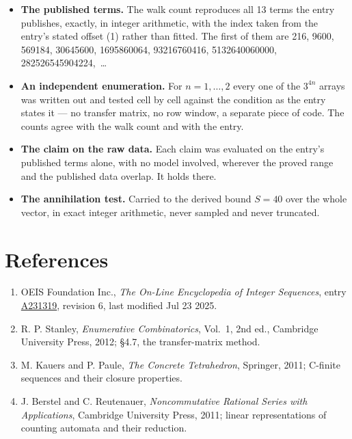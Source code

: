 \documentclass[11pt]{article}
\theoremstyle{definition}
\begin{document}
\begin{itemize}

\item {\bfseries The published terms.} The walk count reproduces all 13 terms the entry publishes, exactly, in integer arithmetic, with the index taken from the entry's stated offset (1) rather than fitted. The first of them are 216, 9600, 569184, 30645600, 1695860064, 93216760416, 5132640060000, 282526545904224,~\dots

\item {\bfseries An independent enumeration.} For $n = 1,\dots,2$ every one of the $3^{4n}$ arrays was written out and tested cell by cell against the condition as the entry states it --- no transfer matrix, no row window, a separate piece of code. The counts agree with the walk count and with the entry.

\item {\bfseries The claim on the raw data.} Each claim was evaluated on the entry's published terms alone, with no model involved, wherever the proved range and the published data overlap. It holds there.

\item {\bfseries The annihilation test.} Carried to the derived bound $S = 40$ over the whole vector, in exact integer arithmetic, never sampled and never truncated.

\end{itemize}

\section{References}

\begin{enumerate}

\item OEIS Foundation Inc., \emph{The On-Line Encyclopedia of Integer Sequences}, entry \href{https://oeis.org/A231319}{A231319}, revision 6, last modified Jul 23 2025.

\item R. P. Stanley, \emph{Enumerative Combinatorics}, Vol.~1, 2nd ed., Cambridge University Press, 2012; \S4.7, the transfer-matrix method.

\item M. Kauers and P. Paule, \emph{The Concrete Tetrahedron}, Springer, 2011; C-finite sequences and their closure properties.

\item J. Berstel and C. Reutenauer, \emph{Noncommutative Rational Series with Applications}, Cambridge University Press, 2011; linear representations of counting automata and their reduction.

\end{enumerate}
\end{document}
